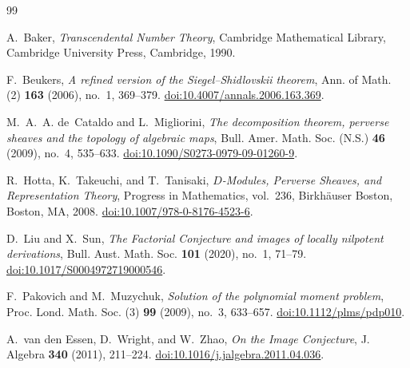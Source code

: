 \documentclass[11pt]{article}
\numberwithin{equation}{section}
\theoremstyle{definition}
\theoremstyle{remark}
\begin{document}
\footnotesize
\begin{thebibliography}{99}

A.~Baker,
\emph{Transcendental Number Theory},
Cambridge Mathematical Library,
Cambridge University Press, Cambridge, 1990.

F.~Beukers,
\emph{A refined version of the Siegel--Shidlovskii theorem},
Ann. of Math. (2) \textbf{163} (2006), no.~1, 369--379.
\href{https://doi.org/10.4007/annals.2006.163.369}{doi:10.4007/annals.2006.163.369}.

M.~A.~A. de~Cataldo and L.~Migliorini,
\emph{The decomposition theorem, perverse sheaves and the topology of algebraic maps},
Bull. Amer. Math. Soc. (N.S.) \textbf{46} (2009), no.~4, 535--633.
\href{https://doi.org/10.1090/S0273-0979-09-01260-9}{doi:10.1090/S0273-0979-09-01260-9}.


R.~Hotta, K.~Takeuchi, and T.~Tanisaki,
\emph{$D$-Modules, Perverse Sheaves, and Representation Theory},
Progress in Mathematics, vol.~236,
Birkh\"auser Boston, Boston, MA, 2008.
\href{https://doi.org/10.1007/978-0-8176-4523-6}{doi:10.1007/978-0-8176-4523-6}.

D.~Liu and X.~Sun,
\emph{The Factorial Conjecture and images of locally nilpotent derivations},
Bull. Aust. Math. Soc. \textbf{101} (2020), no.~1, 71--79.
\href{https://doi.org/10.1017/S0004972719000546}{doi:10.1017/S0004972719000546}.

F.~Pakovich and M.~Muzychuk,
\emph{Solution of the polynomial moment problem},
Proc. Lond. Math. Soc. (3) \textbf{99} (2009), no.~3, 633--657.
\href{https://doi.org/10.1112/plms/pdp010}{doi:10.1112/plms/pdp010}.


A.~van den Essen, D.~Wright, and W.~Zhao,
\emph{On the Image Conjecture},
J. Algebra \textbf{340} (2011), 211--224.
\href{https://doi.org/10.1016/j.jalgebra.2011.04.036}{doi:10.1016/j.jalgebra.2011.04.036}.

\end{thebibliography}
\end{document}
